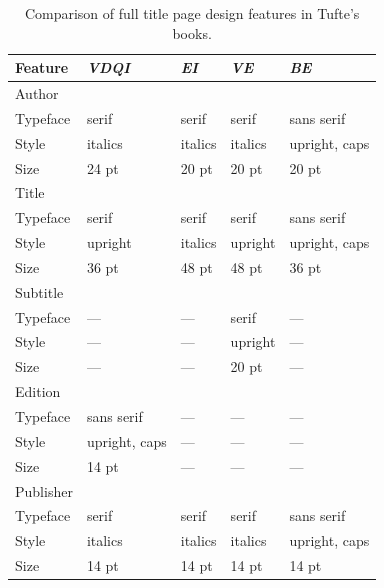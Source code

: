 \documentclass[a4paper]{tufte-book}
\newcommand{\vdqi}{\textit{VDQI}\xspace}
\newcommand{\ei}{\textit{EI}\xspace}
\newcommand{\ve}{\textit{VE}\xspace}
\newcommand{\be}{\textit{BE}\xspace}
\newcommand{\na}{\quad---}
\begin{document}
\bigskip
\begin{table}[h]
  \footnotesize%
  \begin{center}
    \begin{tabular}{lllll}
      \toprule
      Feature        & \vdqi\        & \ei\    & \ve\    & \be{} \\
      \midrule      
      Author         &               &         &         & \\
      \quad Typeface & serif         & serif   & serif   & sans serif \\
      \quad Style    & italics       & italics & italics & upright, caps \\
      \quad Size     & 24 pt         & 20 pt   & 20 pt   & 20 pt \\
      \addlinespace      
      Title          &               &         &         & \\
      \quad Typeface & serif         & serif   & serif   & sans serif \\
      \quad Style    & upright       & italics & upright & upright, caps \\
      \quad Size     & 36 pt         & 48 pt   & 48 pt   & 36 pt \\
      \addlinespace      
      Subtitle       &               &         &         & \\
      \quad Typeface & \na\          & \na\    & serif   & \na{} \\
      \quad Style    & \na\          & \na\    & upright & \na{} \\
      \quad Size     & \na\          & \na\    & 20 pt   & \na{} \\
      \addlinespace
      Edition        &               &         &         & \\
      \quad Typeface & sans serif    & \na\    & \na\    & \na{} \\
      \quad Style    & upright, caps & \na\    & \na\    & \na{} \\
      \quad Size     & 14 pt         & \na\    & \na\    & \na{} \\
      \addlinespace
      Publisher      &               &         &         & \\
      \quad Typeface & serif         & serif   & serif   & sans serif \\
      \quad Style    & italics       & italics & italics & upright, caps \\
      \quad Size     & 14 pt         & 14 pt   & 14 pt   & 14 pt \\
      \bottomrule
      \end{tabular}
      \caption{Comparison of full title page design features in Tufte's books.}%
      \label{tab:title-page}
  \end{center}
\end{table}
\end{document}
